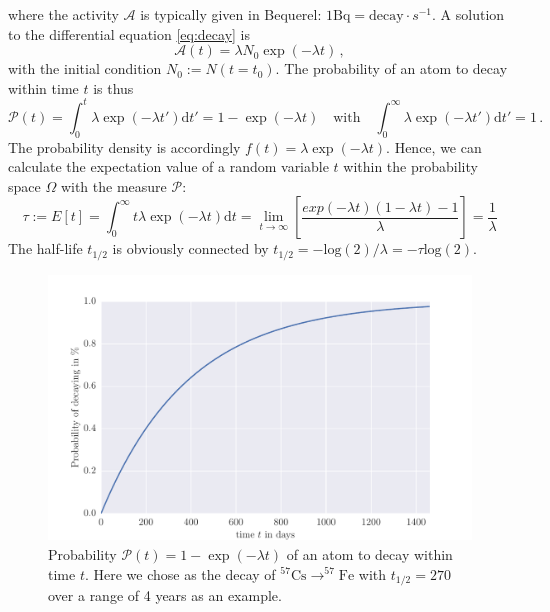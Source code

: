 where the activity $\mathcal{A}$ is typically given in Bequerel: $1 \textrm{Bq}= \textrm{decay}\cdot s^{-1}$.
A solution to the differential equation \eqref{eq:decay} is
\begin{equation}
    \mathcal{A}(t) = \lambda N_0 \exp(-\lambda t) \, ,
\end{equation}
with the initial condition $N_0 := N(t=t_0)$. 
The probability of an atom to decay within time $t$ is thus
\begin{equation}
    \mathcal{P}(t) = \int_{0}^{t}\lambda \exp(-\lambda t')\mathrm{d}t' = 1 -  \exp(-\lambda t)  \quad
    \textrm{with} \quad \int_{0}^{\infty}\lambda \exp(-\lambda t')\mathrm{d}t' = 1 \, .
\end{equation}
The probability density is accordingly $f(t) = \lambda \exp(-\lambda t)$. 
Hence, we can calculate the expectation value of a random variable $t$ within the probability space
$\Omega$ with the measure  $\mathcal{P}$:
\begin{equation}
    \tau := E[t] = \int_{0}^{\infty} t \lambda \exp(-\lambda t) \mathrm{d}t 
    =\lim_{t \rightarrow \infty}\left[ \frac{exp(-\lambda t) (1-\lambda t) - 1 }{\lambda} \right] 
= \frac{1}{\lambda}
\end{equation}
The half-life $t_{1/2}$ is obviously connected by $t_{1/2}= -\mathrm{log}(2)/ \lambda = - \tau \mathrm{log}(2)$.
\begin{figure}[htpb]
    \centering
    \includegraphics[width=0.9\linewidth]{analysis/figures/halflife}
    \caption{Probability $\mathcal{P}(t) = 1 -  \exp(-\lambda t)$ of an atom to decay within time $t$.
        Here we chose as the decay of
        $^{57}\textrm{Cs}\rightarrow ^{57}\textrm{Fe}$ with $t_{1/2}=270$ over a range
    of 4 years as an example.}
    \label{fig:decay}
\end{figure}
\clearpage
